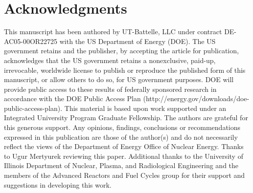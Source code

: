 \documentclass{style/nseJournal}
\begin{document}


\section*{Acknowledgments}
This manuscript has been authored by UT-Battelle, LLC under contract DE-AC05-00OR22725 with the US Department of Energy (DOE). The US government retains and the publisher, by accepting the article for publication, acknowledges that the US government retains a nonexclusive, paid-up, irrevocable, worldwide license to publish or reproduce the published form of this manuscript, or allow others to do so, for US government purposes. DOE will provide public access to these results of federally sponsored research in accordance with the DOE Public Access Plan (http://energy.gov/downloads/doe-public-access-plan).
This material is based upon work supported under an Integrated University Program Graduate Fellowship.
The authors are grateful for this generous support.
Any opinions, findings, conclusions or recommendations expressed in this publication are
those of the author(s) and do not necessarily reflect the views of the Department of Energy
Office of Nuclear Energy.
Thanks to Ugur Mertyurek reviewing this paper.
Additional thanks to the University of Illinois Department of Nuclear, Plasma, and Radiological Engineering and the members of the Advanced Reactors and Fuel Cycles group for their support and suggestions in developing this work.
\end{document}
